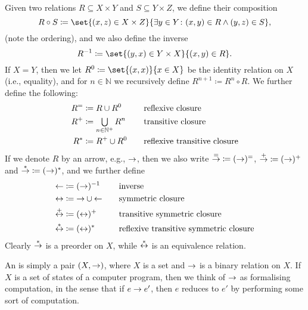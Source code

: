 \documentclass[a4paper, 11pt, article, danish, oneside]{memoir}
\newcommand{\naturals}{\mathbb{N}}
\newcommand*\union\cup
\DeclareMathOperator*{\smallbigcup}{\textstyle\bigcup}
\DeclareMathOperator*{\bigunion}{\mathchoice
    {\smallbigcup}%
    {\bigcup}%
    {\bigcup}%
    {\bigcup}%
}
\newcommand{\defeq}{\coloneqq}
\newcommand\inv{^{-1}}
\renewcommand{\prod}{\times}
\begin{document}
Given two relations $R \subseteq X \prod Y$ and $S \subseteq Y \prod Z$, we define their composition
%
\begin{equation*}
    R \circ S
        \defeq \set{(x,z) \in X \prod Z}{\exists y \in Y \colon (x,y) \in R \land (y,z) \in S},
\end{equation*}
%
(note the ordering), and we also define the inverse
%
\begin{equation*}
    R\inv
        \defeq \set{(y,x) \in Y \prod X}{(x,y) \in R}.
\end{equation*}
%
If $X = Y$, then we let $R^0 \defeq \set{(x,x)}{x \in X}$ be the identity relation on $X$ (i.e., equality), and for $n \in \naturals$ we recursively define $R^{n+1} \defeq R^n \circ R$. We further define the following:
%
\begin{alignat*}{2}
    R^= &\defeq R \union R^0 && \quad \text{reflexive closure} \\
    R^+ &\defeq \bigunion_{n\in\naturals^+} R^n && \quad \text{transitive closure} \\
    R^* &\defeq R^+ \union R^0 && \quad \text{reflexive transitive closure}
\end{alignat*}
%
If we denote $R$ by an arrow, e.g., $\rightarrow$, then we also write ${\reduceR} \defeq (\reduce)^=$, ${\reduceT} \defeq (\reduce)^+$ and ${\reduceRT} \defeq (\reduce)^*$, and we further define
%
\begin{alignat*}{2}
    {\reduceI} &\defeq (\reduce)\inv && \quad \text{inverse} \\
    {\reduceS} &\defeq {\reduce} \union {\reduceI} && \quad \text{symmetric  closure} \\
    {\reduceTS} &\defeq (\reduceS)^+ && \quad \text{transitive symmetric closure} \\
    {\reduceRTS} &\defeq (\reduceS)^* && \quad \text{reflexive transitive symmetric closure}
\end{alignat*}
%
Clearly $\overset{*}{\rightarrow}$ is a preorder on $X$, while $\overset{*}{\leftrightarrow}$ is an equivalence relation.

An  is simply a pair $(X,\rightarrow)$, where $X$ is a set and $\rightarrow$ is a binary relation on $X$. If $X$ is a set of states of a computer program, then we think of $\rightarrow$ as formalising computation, in the sense that if $e \rightarrow e'$, then $e$ reduces to $e'$ by performing some sort of computation.
\end{document}
